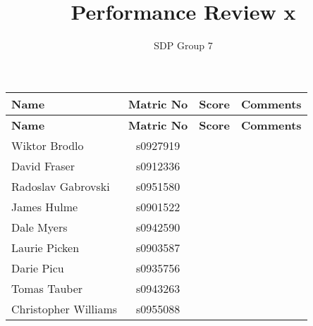 \documentclass[10pt, a4paper]{article} %
\begin{document}
\title{Performance Review x}
\author{SDP Group 7}
\maketitle

\begin{longtable}{l c c p{3cm}}
    \textbf{Name} &
    \textbf{Matric No} &
    \textbf{Score} &
    \textbf{Comments}\\
    \hline
    \endfirsthead


    \textbf{Name} &
    \textbf{Matric No} &
    \textbf{Score} &
    \textbf{Comments}\\
    \hline
    \endhead

    Wiktor Brodlo &
    s0927919 &
    &
    \\

    David Fraser &
    s0912336 &
    &
    \\

    Radoslav Gabrovski &
    s0951580 &
    & 
    \\

    James Hulme &
    s0901522 &
    & 
    \\

    Dale Myers &
    s0942590 &
    &
    \\

    Laurie Picken &
    s0903587 &
    &
    \\

    Darie Picu &
    s0935756 &
    &
    \\

    Tomas Tauber &
    s0943263 &
    &
    \\

    Christopher Williams &
    s0955088 &
    &
    \\


\end{longtable}
\end{document}
